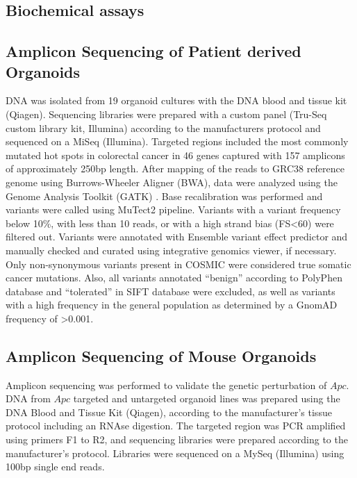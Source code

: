 \begin{flushleft}
\section{Biochemical assays}

\subsection{Amplicon Sequencing of Patient derived Organoids}
DNA was isolated from 19 organoid cultures with the DNA blood and tissue kit (Qiagen). Sequencing libraries were prepared with a custom panel (Tru-Seq custom library kit, Illumina) according to the manufacturers protocol and sequenced on a MiSeq (Illumina). Targeted regions included the most commonly mutated hot spots in colorectal cancer in 46 genes captured with 157 amplicons of approximately 250bp length. After mapping of the reads to GRC38 reference genome using Burrows-Wheeler Aligner (BWA), data were analyzed using the Genome Analysis Toolkit (GATK) \citep{aGenomeAnalysisToolkit2010}. Base recalibration was performed and variants were called using MuTect2 pipeline. Variants with a variant frequency below 10\%, with less than 10 reads, or with a high strand bias (FS<60) were filtered out. Variants were annotated with Ensemble variant effect predictor \citep{mclarenEnsemblVariantEffect2016} and manually checked and curated using integrative genomics viewer, if necessary. Only non-synonymous variants present in COSMIC \citep{forbesCatalogueSomaticMutations2008} were considered true somatic cancer mutations.
Also, all variants annotated “benign” according to PolyPhen database and “tolerated” in SIFT database were excluded, as well as variants with a high frequency in the general population as determined by a GnomAD \citep{lekAnalysisProteincodingGenetic2016} frequency of >0.001.

\subsection{Amplicon Sequencing of Mouse Organoids}
Amplicon sequencing was performed to validate the genetic perturbation of $Apc$. DNA from $Apc$ targeted and untargeted organoid lines was prepared using the DNA Blood and Tissue Kit (Qiagen), according to the manufacturer’s tissue protocol including an RNAse digestion. The targeted region was PCR amplified using primers F1 to R2, and sequencing libraries were prepared according to the manufacturer’s protocol. Libraries were sequenced on a MySeq (Illumina) using 100bp single end reads. 


\end{flushleft}
